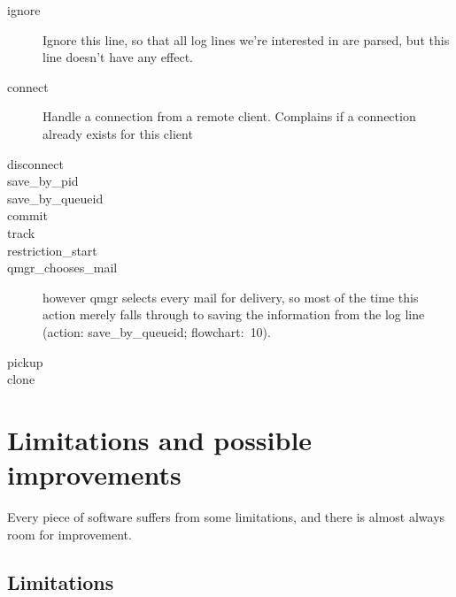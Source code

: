 \documentclass[a4paper,12pt,draft]{article}
\begin{document}
\begin{description}

    \item [ignore] Ignore this line, so that all log lines we're interested
        in are parsed, but this line doesn't have any effect.

    \item [connect] Handle a connection from a remote client.  Complains if
        a connection already exists for this client

    \item [disconnect] 

    \item [save\_by\_pid] 

    \item [save\_by\_queueid] 

    \item [commit] 

    \item [track] 

    \item [restriction\_start] 

    \item [qmgr\_chooses\_mail] 
        however qmgr selects every mail for delivery, so most of the time
        this action merely falls through to saving the information from the
        log line (action: save\_by\_queueid; flowchart:~10).

    \item [pickup] 

    \item [clone] 

\end{description}


\section{Limitations and possible improvements}

Every piece of software suffers from some limitations, and there is almost
always room for improvement.

\subsection{Limitations}
\end{document}
